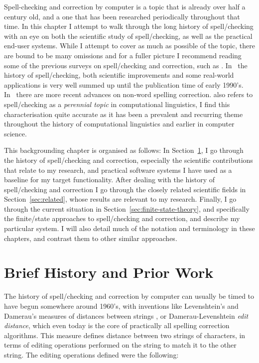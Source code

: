 \documentclass[officiallayout]{unihelcompling}
\begin{document}
Spell-checking and correction by computer is a topic that is already over half
a century old, and a one that has been researched periodically throughout that
time.  In this chapter I attempt to walk through the long history of
spell\-/checking with an eye on both the scientific study of spell\-/checking,
as well as the practical end-user systems. While I attempt to cover as
much as possible of the topic, there are bound to be many omissions and for
a fuller picture I recommend reading some of the previous surveys on
spell\-/checking and correction, such as
\citet{kukich1992spelling,mitton2009ordering}.  In~\citet{kukich1992spelling}
the history of spell\-/checking, both scientific improvements and some
real-world applications is very well summed up until the publication time of
early 1990's.  In~\citet{mitton2009ordering} there are more recent advances on
non-word spelling correction.  \citet{kukich1992spelling} also refers to
spell\-/checking as a \emph{perennial topic} in computational linguistics, I
find this characterisation quite accurate as it has been a prevalent and
recurring theme throughout the history of computational linguistics and earlier
in computer science.


This backgrounding chapter is organised as follows: In
Section~\ref{sec:history}, I go through the history of spell\-/checking and
correction, especially the scientific contributions that relate to my research,
and practical software systems I have used as a baseline for my target
functionality.  After dealing with the history of spell\-/checking and
correction I go through the closely related scientific fields in
Section~\ref{sec:related}, whose results are relevant to my research. Finally,
I go through the current situation in Section~\ref{sec:finite-state-theory},
and specifically the finite\-/state approaches to spell\-/checking and
correction, and describe my particular system. I will also detail much of the
notation and terminology in these chapters, and contrast them to other similar
approaches.

\section{Brief History and Prior Work}
\label{sec:history}

The history of spell\-/checking and correction by computer can usually be timed
to have begun somewhere around 1960's, with inventions like Levenshtein's and
Damerau's measures of distances between strings
\citep{levenshtein1966binary,damerau1964technique}, or Damerau-Levenshtein
\emph{edit distance}, which even today is the core of practically all spelling
correction algorithms. This measure defines distance between two strings of
characters, in terms of editing operations performed on the string to match it
to the other string. The editing operations defined were the following:
\end{document}
